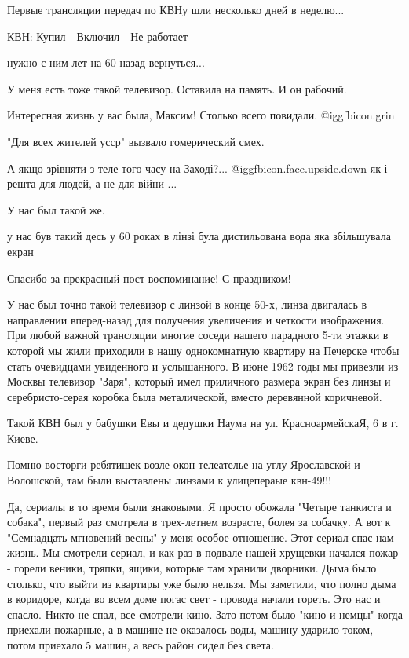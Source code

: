 \begin{itemize}
Первые трансляции передач по КВНу шли несколько дней в неделю...

КВН: Купил - Включил - Не работает

\begin{itemize} %
нужно с ним лет на 60 назад вернуться...
\end{itemize} %

У меня есть тоже такой телевизор. Оставила на память. И он рабочий.

Интересная жизнь у вас была, Максим! Столько всего повидали. @igg{fbicon.grin} 

"Для всех жителей усср" вызвало гомерический смех.

А якщо зрівняти з теле того часу на Заході?...  @igg{fbicon.face.upside.down}  як і решта для людей, а не для війни ...

У нас был такой же.

у нас був такий десь у 60 роках в лінзі була дистильована вода яка збільшувала екран


Спасибо за прекрасный пост-воспоминание! С праздником!


У нас был точно такой телевизор с линзой в конце 50-х, линза двигалась в
направлении вперед-назад для получения увеличения и четкости изображения. При
любой важной трансляции многие соседи нашего парадного 5-ти этажки в которой
мы жили приходили в нашу однокомнатную квартиру на Печерске чтобы стать
очевидцами увиденного и услышанного. В июне 1962 годы мы привезли из Москвы
телевизор "Заря", который имел приличного размера экран без линзы и
серебристо-серая коробка была металической, вместо деревянной коричневой.


Такой КВН был у бабушки Евы и дедушки Наума на ул. КрасноармейскаЯ, 6 в г. Киеве.


Помню восторги ребятишек возле окон телеателье на углу Ярославской и Волошской,
там были выставлены линзами к улицепераые квн-49!!!


Да, сериалы в то время были знаковыми. Я просто обожала "Четыре танкиста и
собака", первый раз смотрела в трех-летнем возрасте, болея за собачку. А вот к
"Семнадцать мгновений весны" у меня особое отношение. Этот сериал спас нам
жизнь. Мы смотрели сериал, и как раз в подвале нашей хрущевки начался пожар -
горели веники, тряпки, ящики, которые там хранили дворники. Дыма было столько,
что выйти из квартиры уже было нельзя. Мы заметили, что полно дыма в коридоре,
когда во всем доме погас свет - провода начали гореть. Это нас и спасло. Никто
не спал, все смотрели кино. Зато потом было "кино и немцы" когда приехали
пожарные, а в машине не оказалось воды, машину ударило током, потом приехало 5
машин, а весь район сидел без света.


\end{itemize}
